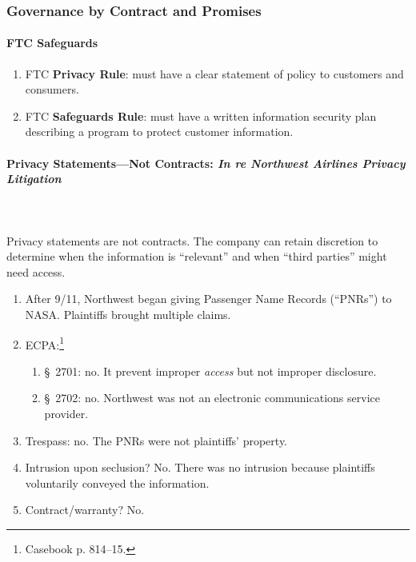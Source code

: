 \subsubsection{Governance by Contract and Promises}

\paragraph{FTC Safeguards}

\begin{enumerate}
    \item FTC \textbf{Privacy Rule}: must have a clear statement of policy to 
    customers and consumers.
    \item FTC \textbf{Safeguards Rule}: must have a written information security 
    plan describing a program to protect customer information.
\end{enumerate}

\paragraph{Privacy Statements---Not Contracts: \emph{In re Northwest Airlines 
Privacy Litigation}}
~\\\\

Privacy statements are not contracts. The company can retain discretion to 
determine when the information is ``relevant'' and when ``third parties'' might 
need access.

\begin{enumerate}
    \item After 9/11, Northwest began giving Passenger Name Records (``PNRs'') 
    to NASA. Plaintiffs brought multiple claims.
    \item ECPA:\footnote{Casebook p. 814--15.}
    \begin{enumerate}
        \item \S\ 2701: no. It prevent improper \emph{access} but not improper 
        disclosure.
        \item \S\ 2702: no. Northwest was not an electronic communications 
        service provider.
    \end{enumerate}
    \item Trespass: no. The PNRs were not plaintiffs' property.
    \item Intrusion upon seclusion? No. There was no intrusion because 
    plaintiffs voluntarily conveyed the information.
    \item Contract/warranty? No.
\end{enumerate}

